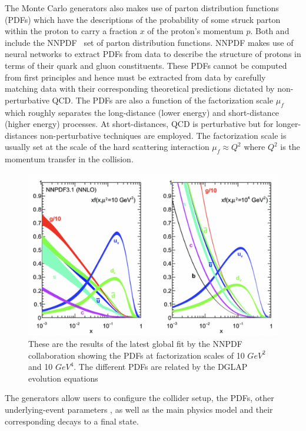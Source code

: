 The Monte Carlo generators also makes use of parton distribution functions (PDFs) which have the descriptions of the probability of some struck parton within the proton to carry a fraction $x$ of the proton's momentum $p$. Both \SHERPA and  include the NNPDF~\cite{NNPDF:2021uiq} set of parton distribution functions. NNPDF makes use of neural networks to extract PDFs from data to describe the structure of protons in terms of their quark and gluon constituents. These PDFs cannot be computed from first principles and hence must be extracted from data by carefully matching data with their corresponding theoretical predictions dictated by non-perturbative QCD. The PDFs are also a function of the factorization scale $\mu_{f}$ which roughly separates the long-distance (lower energy) and short-distance (higher energy) processes. At short-distances, QCD is perturbative but for longer-distances non-perturbative techniques are employed. The factorization scale is usually set at the scale of the hard scattering interaction $\mu_{f} \approx Q^{2}$ where $Q^2$ is the momentum transfer in the collision.

\begin{figure}[!htb]
	\centering
	\includegraphics[scale=0.5]{fig/NNPDFGlobalFit.png}
	\caption{These are the results of the latest global fit by the NNPDF collaboration showing the PDFs at factorization scales of 10 $GeV^{2}$ and 10 $GeV^{4}$. The different PDFs are related by the DGLAP evolution equations~\cite{DelDebbio:2018siw}}
	\label{fig:NNPDF}
\end{figure}

The generators allow users to configure the collider setup, the PDFs, other underlying-event parameters \cite{Sirunyan:2019dfx}, as well as the main physics model and their corresponding decays to a final state. 


